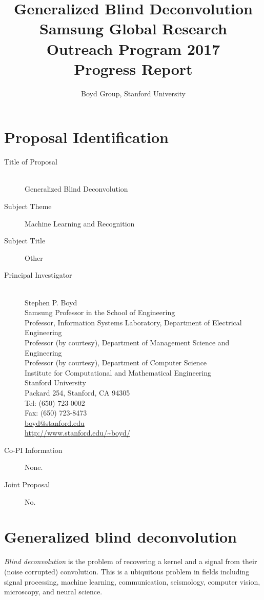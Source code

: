 \documentclass[12pt]{article}
\title{\large \bf Generalized Blind Deconvolution\\
\small Samsung Global Research Outreach Program 2017\\
\small Progress Report}
\author{Boyd Group, Stanford University}
\date{}
\begin{document}
\maketitle

\section{Proposal Identification}
\begin{description}
\item[Title of Proposal]\hfill\\ Generalized Blind Deconvolution
\item[Subject Theme] Machine Learning and Recognition
\item[Subject Title] Other
\item[Principal Investigator] \hfill\\
Stephen P. Boyd\\
Samsung Professor in the School of Engineering\\
Professor, Information Systems Laboratory, Department of Electrical Engineering\\
Professor (by courtesy), Department of Management Science and Engineering\\
Professor (by courtesy), Department of Computer Science\\
Institute for Computational and Mathematical Engineering\\
Stanford University\\
Packard 254, Stanford, CA 94305\\
Tel: (650) 723-0002\\
Fax: (650) 723-8473\\
\url{boyd@stanford.edu}\\
\url{http://www.stanford.edu/~boyd/}\\
\item[Co-PI Information] None.
\item[Joint Proposal] No.
\end{description}

\newpage


\section{Generalized blind deconvolution}
\emph{Blind deconvolution} is the problem of recovering a kernel and a signal from 
their (noise corrupted) convolution.
This is a ubiquitous problem in fields including signal processing, 
machine learning, communication, seismology, computer vision, microscopy, and neural science. 
\end{document}

